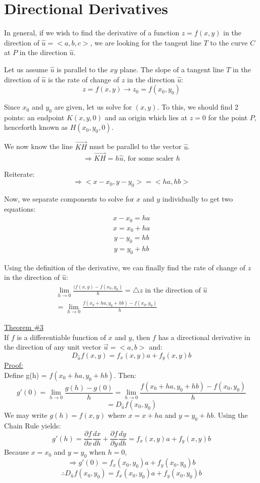 \documentclass[12pt]{article}
\begin{document}
\section{Directional Derivatives}
In general, if we wish to find the derivative of a function \(z=f(x,y)\) in the direction of \(\hat{u} = <a,b,c>\), we are looking for the tangent line \(T\) to the curve \(C\) at \(P\) in the direction \(\hat{u}\).

Let us assume \(\hat{u}\) is parallel to the \(xy\) plane. The slope of a tangent line \(T\) in the direction of \(\hat{u}\) is the rate of change of \(z\) in the direction \(\hat{u}\):
\[
	z=f(x,y) \to z_0 = f(x_0, y_0)
\]

Since \(x_0\) and \(y_0\) are given, let us solve for \((x,y)\). To this, we should find 2 points: an endpoint \(K(x,y,0)\) and an origin which lies at \(z=0\) for the point \(P\), henceforth known as \(H(x_0,y_0,0)\). 

We now know the line \(\vec{KH} \) must be parallel to the vector \(\hat{u}\).
\[
	\Rightarrow \vec{KH} = h\hat{u} \text{, for some scaler \(h\)}
\]

Reiterate:
\[
	\Rightarrow <x-x_0,y-y_0> = <ha,hb>
\]

Now, we separate components to solve for \(x\) and \(y\) individually to get two equations:
\begin{align}
	\nonumber x-x_0 = ha\\
	x = x_0 + ha
\end{align}
\begin{align}
	\nonumber y - y_0 = hb\\
	y = y_0 + hb
\end{align}

Using the definition of the derivative, we can finally find the rate of change of \(z\) in the direction of \(\hat{u}\):
\begin{align}
	\lim_{h \to 0} \frac{(f(x,y) - f(x_0,y_0)}{h} = \triangle z \text{ in the direction of \(\hat{u}\)}\\
	= \lim_{h \to 0} \frac{f(x_0 + ha, y_0 + hb) - f(x_0,y_0)}{h}
\end{align}

\underline{Theorem \#3}\\
If \(f\) is a differentiable function of \(x\) and \(y\), then \(f\) has a directional derivative in the direction of any unit vector \(\vec{u}  = <a,b>\) and:
\[
	D_{\hat{u}}f(x,y) = f_x(x,y)a + f_y(x,y)b
\]
\underline{Proof:} \\
Define g(h) = \(f(x_0+ha,y_0+hb)\). Then:
\[
	g'(0) = \lim_{h \to 0} \frac{g(h) - g(0)}{h} = \lim_{h \to 0} \frac{f(x_0 + ha,y_0+hb) - f(x_0,y_0)}{h}
\]
\[
=	D_{\hat{u}}f(x_0,y_0) 
\]
We may write \(g(h) = f(x,y)\) where \(x=x+ha\) and \(y=y_0 +hb\). 
Using the Chain Rule yields:
\[
	g'(h) = \frac{\partial f}{\partial x} \frac{dx}{dh}+ \frac{\partial f}{\partial y} \frac{dy}{dh} = f_x(x,y)a + f_y(x,y)b
\]
Because \(x=x_0\) and \(y=y_0\) when \(h=0\),
\[
	\Rightarrow g'(0) = f_x(x_0,y_0)a + f_y(x_0,y_0)b
\]
\[
	\therefore D_{\hat{u} }f(x_0,y_0) = f_x(x_0,y_0)a + f_y(x_0,y_0)b
\]
\end{document}
